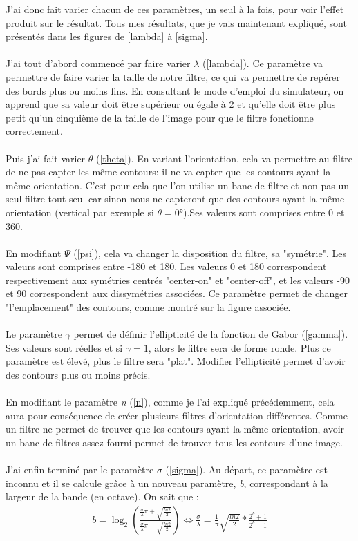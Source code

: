 \documentclass[poster]{polytech/polytech}
\begin{document}
J'ai donc fait varier chacun de ces paramètres, un seul à la fois, pour voir l'effet produit sur le résultat. Tous mes résultats, que je vais maintenant expliqué, sont présentés dans les figures de \autoref{lambda} à \autoref{sigma}.\\
\\
J'ai tout d'abord commencé par faire varier $\lambda $ (\autoref{lambda}). Ce paramètre va permettre de faire varier la taille de notre filtre, ce qui va permettre de repérer des bords plus ou moins fins. En consultant le mode d'emploi du simulateur, on apprend que sa valeur doit être supérieur ou égale à 2 et qu'elle doit être plus petit qu'un cinquième de la taille de l'image pour que le filtre fonctionne correctement.\\
\\
Puis j'ai fait varier $\theta $ (\autoref{theta}). En variant l'orientation, cela va permettre au filtre de ne pas capter les même contours: il ne va capter que les contours ayant la même orientation. C'est pour cela que l'on utilise un banc de filtre et non pas un seul filtre tout seul car sinon nous ne capteront que des contours ayant la même orientation (vertical par exemple si $\theta = 0 $°).Ses valeurs sont comprises entre 0 et 360.\\
\\
En modifiant $\Psi $ (\autoref{psi}), cela va changer la disposition du filtre, sa "symétrie". Les valeurs sont comprises entre -180 et 180. Les valeurs 0 et 180 correspondent respectivement aux symétries centrés "center-on" et "center-off", et les valeurs -90 et 90 correspondent aux dissymétries associées. Ce paramètre permet de changer "l'emplacement" des contours, comme montré sur la figure associée.\\
\\
Le paramètre $\gamma $ permet de définir l'ellipticité de la fonction de Gabor (\autoref{gamma}). Ses valeurs sont réelles et si $\gamma = 1 $, alors le filtre sera de forme ronde. Plus ce paramètre est élevé, plus le filtre sera "plat". Modifier l'ellipticité permet d'avoir des contours plus ou moins précis.\\
\\
En modifiant le paramètre \textit{n} (\autoref{n}), comme je l'ai expliqué précédemment, cela aura pour conséquence de créer plusieurs filtres d'orientation différentes. Comme un filtre ne permet de trouver que les contours ayant la même orientation, avoir un banc de filtres assez fourni permet de trouver tous les contours d'une image.\\
\\
J'ai enfin terminé par le paramètre $\sigma $ (\autoref{sigma}). Au départ, ce paramètre est inconnu et il se calcule grâce à un nouveau paramètre, \textit{b}, correspondant à la largeur de la bande (en octave). On sait que :
\begin{align*}
b = \log _2 (\frac{\frac{\sigma}{\lambda} \pi + \sqrt{\frac{ln 2}{2}}}{\frac{\sigma}{\lambda} \pi - \sqrt{\frac{ln 2}{2}}})\Leftrightarrow \frac{\sigma}{\lambda} = \frac{1}{\pi } \sqrt{\frac{ln 2}{2}} * \frac{2^b + 1}{2^b - 1}
\end{align*}
\end{document}
